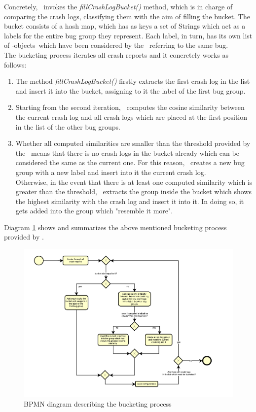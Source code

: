 Concretely, \toolname\ invokes the \textit{fillCrashLogBucket()} method, which is in charge of comparing the crash logs, classifying them with the aim of filling the bucket. 
The bucket consists of a hash map, which has as keys a set of Strings which act as a labels for the entire bug group they represent. Each label, in turn, has its own list of \Crash-objects\, which have been considered by the \Oracle\ referring to the same bug.  \\
The bucketing process iterates all crash reports and it concretely works as follows: 
\begin{enumerate}
\item The method \textit{fillCrashLogBucket()} firstly extracts the first crash log in the list and insert it into the bucket, assigning to it the label of the first bug group. 
\item Starting from the second iteration, \toolname\ computes the cosine similarity between the current crash log and all crash logs which are placed at the first position in the list of the other bug groups. 
\item Whether all computed similarities are smaller than the threshold provided by the \Oracle\, means that there is no crash logs in the bucket already which can be considered the same as the current one. For this reason, \toolname\ creates a new bug group with a new label and insert into it the current crash log. \\
Otherwise, in the event that there is at least one computed similarity which is greater than the threshold, \toolname\ extracts the group inside the bucket which shows the highest similarity with the crash log and insert it into it.
In doing so, it gets added into the group which "resemble it more". 
\end{enumerate}
Diagram \ref{bucketing} shows and summarizes the above mentioned bucketing process provided by \toolname. \\
\clearpage 

\begin{figure}[tb]
\centering 
\includegraphics[width=\columnwidth]{diagrams/bucketingprocess.pdf} 
\caption{BPMN diagram describing the bucketing process}
\label{bucketing}
\end{figure}

